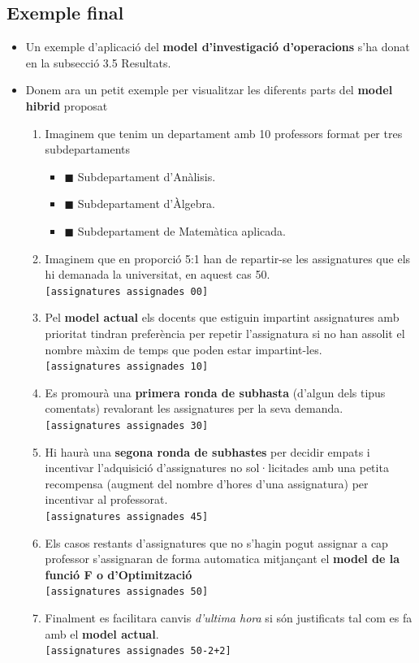 \documentclass[10pt,twocolumn]{article}
\begin{document}
\subsection{Exemple final}
\begin{itemize}
	\item Un exemple d'aplicació del \textbf{model d'investigació d'operacions} s'ha donat en la subsecció 3.5 Resultats.
	\item Donem ara un petit exemple per visualitzar les diferents parts del \textbf{model hibrid} proposat
	\begin{enumerate}
		\item Imaginem que tenim un departament amb 10 professors format per tres subdepartaments 
		\begin{itemize}
			\item {\color{red!60}$\blacksquare$} Subdepartament d'Anàlisis.
			\item {\color{green!60}$\blacksquare$} Subdepartament d'Àlgebra.
			\item {\color{blue!60}$\blacksquare$} Subdepartament de Matemàtica aplicada.
		\end{itemize}
		 \item Imaginem que en proporció 5:1 han de repartir-se les assignatures que els hi demanada la universitat, en aquest cas 50. \\ \texttt{[assignatures assignades 00]}
		 \item Pel \textbf{model actual} els docents que estiguin impartint assignatures amb prioritat tindran preferència per repetir l'assignatura si no han assolit el nombre màxim de temps que poden estar impartint-les. \\ \texttt{[assignatures assignades 10]}
		 \item Es promourà una \textbf{primera ronda de subhasta} (d'algun dels tipus comentats) revalorant les assignatures per la seva demanda. \\ \texttt{[assignatures assignades 30]}
		 \item Hi haurà una \textbf{segona ronda de subhastes} per decidir empats i incentivar l'adquisició d'assignatures no sol·licitades amb una petita recompensa (augment del nombre d'hores d'una assignatura) per incentivar al professorat.\\ \texttt{[assignatures assignades 45]}
		 \item Els casos restants d'assignatures que no s'hagin pogut assignar a cap professor s'assignaran de forma automatica mitjançant el \textbf{model de la funció F o d'Optimització} \\ \texttt{[assignatures assignades 50]}
		 \item Finalment es facilitara canvis \textit{d'ultima hora} si són justificats tal com es fa amb el \textbf{model actual}. \\ \texttt{[assignatures assignades 50-2+2]}
		\end{enumerate}
\end{itemize}
\newpage
\end{document}

